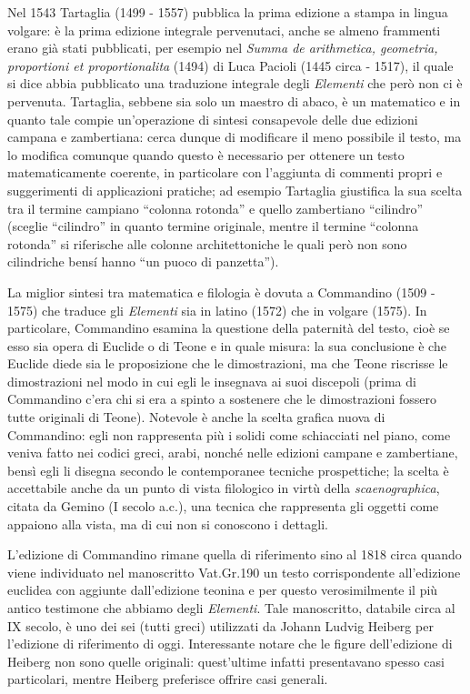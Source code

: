 \par Nel 1543 Tartaglia (1499 - 1557) pubblica la prima edizione a stampa in lingua volgare: \`e la prima edizione integrale pervenutaci, anche se almeno frammenti erano gi\`a stati pubblicati, per esempio nel \textit{Summa de arithmetica, geometria, proportioni et proportionalita} (1494) di Luca Pacioli (1445 circa - 1517), il quale si dice abbia pubblicato una traduzione integrale degli \textit{Elementi} che per\`o non ci \`e pervenuta. Tartaglia, sebbene sia solo un maestro di abaco, \`e un matematico e in quanto tale compie un'operazione di sintesi consapevole delle due edizioni campana e zambertiana: cerca dunque di modificare il meno possibile il testo, ma lo modifica comunque quando questo \`e necessario per ottenere un testo matematicamente coerente, in particolare con l'aggiunta di commenti propri e suggerimenti di applicazioni pratiche; ad esempio Tartaglia giustifica la sua scelta tra il termine campiano ``colonna rotonda'' e quello zambertiano ``cilindro'' (sceglie ``cilindro'' in quanto termine originale, mentre il termine ``colonna rotonda'' si riferische alle colonne architettoniche le quali per\`o non sono cilindriche bens\'i hanno ``un puoco di panzetta'').
\par La miglior sintesi tra matematica e filologia \`e dovuta a Commandino (1509 - 1575) che traduce gli \textit{Elementi} sia in latino (1572) che in volgare (1575). In particolare, Commandino esamina la questione della paternit\`a del testo, cio\`e se esso sia opera di Euclide o di Teone e in quale misura: la sua conclusione \`e che Euclide diede sia le proposizione che le dimostrazioni, ma che Teone riscrisse le dimostrazioni nel modo in cui egli le insegnava ai suoi discepoli (prima di Commandino c'era chi si era a spinto a sostenere che le dimostrazioni fossero tutte originali di Teone). Notevole \`e anche la scelta grafica nuova di Commandino: egli non rappresenta pi\`u i solidi come schiacciati nel piano, come veniva fatto nei codici greci, arabi, nonch\'e nelle edizioni campane e zambertiane, bens\`i egli li disegna secondo le contemporanee tecniche prospettiche; la scelta \`e accettabile anche da un punto di vista filologico in virt\`u della \textit{scaenographica}, citata da Gemino (I secolo a.c.), una tecnica che rappresenta gli oggetti come appaiono alla vista, ma di cui non si conoscono i dettagli.
\par L'edizione di Commandino rimane quella di riferimento sino al 1818 circa quando viene individuato nel manoscritto Vat.Gr.190 un testo corrispondente all'edizione euclidea con aggiunte dall'edizione teonina e per questo verosimilmente il pi\`u antico testimone che abbiamo degli \textit{Elementi}. Tale manoscritto, databile circa al IX secolo, \`e uno dei sei (tutti greci) utilizzati da Johann Ludvig Heiberg per l'edizione di riferimento di oggi. Interessante notare che le figure dell'edizione di Heiberg non sono quelle originali: quest'ultime infatti presentavano spesso casi particolari, mentre Heiberg preferisce offrire casi generali.
